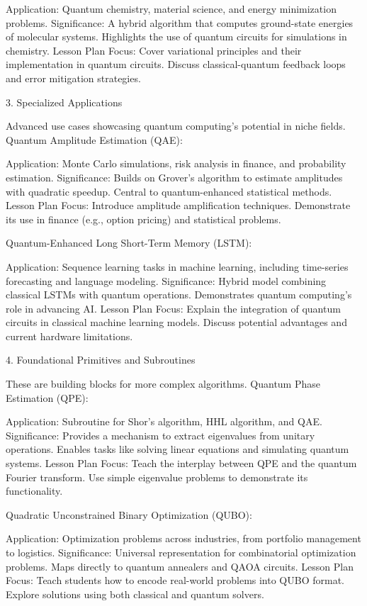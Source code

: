 Application: Quantum chemistry, material science, and energy minimization problems.
Significance:
A hybrid algorithm that computes ground-state energies of molecular systems.
Highlights the use of quantum circuits for simulations in chemistry.
Lesson Plan Focus:
Cover variational principles and their implementation in quantum circuits.
Discuss classical-quantum feedback loops and error mitigation strategies.

3. Specialized Applications

Advanced use cases showcasing quantum computing’s potential in niche fields.
Quantum Amplitude Estimation (QAE):

Application: Monte Carlo simulations, risk analysis in finance, and probability estimation.
Significance:
Builds on Grover’s algorithm to estimate amplitudes with quadratic speedup.
Central to quantum-enhanced statistical methods.
Lesson Plan Focus:
Introduce amplitude amplification techniques.
Demonstrate its use in finance (e.g., option pricing) and statistical problems.

Quantum-Enhanced Long Short-Term Memory (LSTM):

Application: Sequence learning tasks in machine learning, including time-series forecasting and language modeling.
Significance:
Hybrid model combining classical LSTMs with quantum operations.
Demonstrates quantum computing’s role in advancing AI.
Lesson Plan Focus:
Explain the integration of quantum circuits in classical machine learning models.
Discuss potential advantages and current hardware limitations.

4. Foundational Primitives and Subroutines

These are building blocks for more complex algorithms.
Quantum Phase Estimation (QPE):

Application: Subroutine for Shor’s algorithm, HHL algorithm, and QAE.
Significance:
Provides a mechanism to extract eigenvalues from unitary operations.
Enables tasks like solving linear equations and simulating quantum systems.
Lesson Plan Focus:
Teach the interplay between QPE and the quantum Fourier transform.
Use simple eigenvalue problems to demonstrate its functionality.

Quadratic Unconstrained Binary Optimization (QUBO):

Application: Optimization problems across industries, from portfolio management to logistics.
Significance:
Universal representation for combinatorial optimization problems.
Maps directly to quantum annealers and QAOA circuits.
Lesson Plan Focus:
Teach students how to encode real-world problems into QUBO format.
Explore solutions using both classical and quantum solvers.

